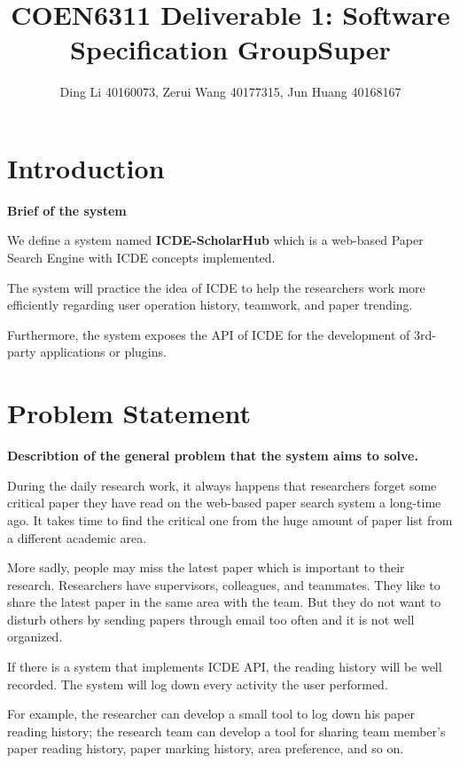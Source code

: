\documentclass[sigconf, nonacm]{../tex_template/acmart}
\begin{document}
\title{COEN6311 Deliverable 1: Software Specification GroupSuper}

\author{Ding Li 40160073, Zerui Wang 40177315, Jun Huang 40168167}

\maketitle

\section{Introduction}
\textbf{Brief of the system}

We define a system named \textbf{ICDE-ScholarHub} which is a web-based Paper Search Engine with ICDE concepts implemented.

The system will practice the idea of ICDE to help the researchers work more efficiently regarding user operation history, teamwork, and paper trending.

Furthermore, the system exposes the API of ICDE for the development of 3rd-party applications or plugins.

\section{Problem Statement}
\textbf{Describtion of the general problem that the system aims to solve.}

During the daily research work, it always happens that researchers forget some critical paper they have read on the web-based paper search system a long-time ago. It takes time to find the critical one from the huge amount of paper list from a different academic area.

More sadly, people may miss the latest paper which is important to their research. Researchers have supervisors, colleagues, and teammates. They like to share the latest paper in the same area with the team. But they do not want to disturb others by sending papers through email too often and it is not well organized.

If there is a  system that implements ICDE API, the reading history will be well recorded. The system will log down every activity the user performed.

For example, the researcher can develop a small tool to log down his paper reading history; the research team can develop a tool for sharing team member’s paper reading history,  paper marking history, area preference, and so on.
\end{document}
